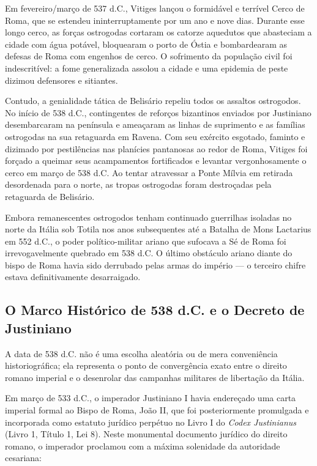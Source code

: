 \documentclass[11pt,a4paper,openany]{book}
\begin{document}
Em fevereiro/março de 537 d.C., Vitiges lançou o formidável e terrível Cerco de Roma, que se estendeu ininterruptamente por um ano e nove dias. Durante esse longo cerco, as forças ostrogodas cortaram os catorze aquedutos que abasteciam a cidade com água potável, bloquearam o porto de Óstia e bombardearam as defesas de Roma com engenhos de cerco. O sofrimento da população civil foi indescritível: a fome generalizada assolou a cidade e uma epidemia de peste dizimou defensores e sitiantes.

Contudo, a genialidade tática de Belisário repeliu todos os assaltos ostrogodos. No início de 538 d.C., contingentes de reforços bizantinos enviados por Justiniano desembarcaram na península e ameaçaram as linhas de suprimento e as famílias ostrogodas na sua retaguarda em Ravena. Com seu exército esgotado, faminto e dizimado por pestilências nas planícies pantanosas ao redor de Roma, Vitiges foi forçado a queimar seus acampamentos fortificados e levantar vergonhosamente o cerco em março de 538 d.C. Ao tentar atravessar a Ponte Mílvia em retirada desordenada para o norte, as tropas ostrogodas foram destroçadas pela retaguarda de Belisário.

Embora remanescentes ostrogodos tenham continuado guerrilhas isoladas no norte da Itália sob Totila nos anos subsequentes até a Batalha de Mons Lactarius em 552 d.C., o poder político-militar ariano que sufocava a Sé de Roma foi irrevogavelmente quebrado em 538 d.C. O último obstáculo ariano diante do bispo de Roma havia sido derrubado pelas armas do império — o terceiro chifre estava definitivamente desarraigado.



\subsection{O Marco Histórico de 538 d.C. e o Decreto de Justiniano}


A data de 538 d.C. não é uma escolha aleatória ou de mera conveniência historiográfica; ela representa o ponto de convergência exato entre o direito romano imperial e o desenrolar das campanhas militares de libertação da Itália.

Em março de 533 d.C., o imperador Justiniano I havia endereçado uma carta imperial formal ao Bispo de Roma, João II, que foi posteriormente promulgada e incorporada como estatuto jurídico perpétuo no Livro I do \textit{Codex Justinianus} (Livro 1, Título 1, Lei 8). Neste monumental documento jurídico do direito romano, o imperador proclamou com a máxima solenidade da autoridade cesariana:
\end{document}
